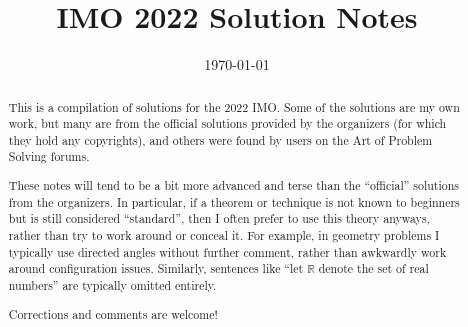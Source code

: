\documentclass[11pt]{scrartcl}
\title{IMO 2022 Solution Notes}
\date{\today}
\begin{document}
\maketitle

\begin{abstract}
This is a compilation of solutions
for the 2022 IMO.
Some of the solutions are my own work,
but many are from the official solutions provided by the organizers
(for which they hold any copyrights),
and others were found by users on the Art of Problem Solving forums.

These notes will tend to be a bit more advanced and terse than the ``official''
solutions from the organizers.
In particular, if a theorem or technique is not known to beginners
but is still considered ``standard'', then I often prefer to
use this theory anyways, rather than try to work around or conceal it.
For example, in geometry problems I typically use directed angles
without further comment, rather than awkwardly work around configuration issues.
Similarly, sentences like ``let $\mathbb{R}$ denote the set of real numbers''
are typically omitted entirely.

Corrections and comments are welcome!
\end{abstract}

\tableofcontents
\newpage

\addtocounter{section}{-1}
\end{document}
